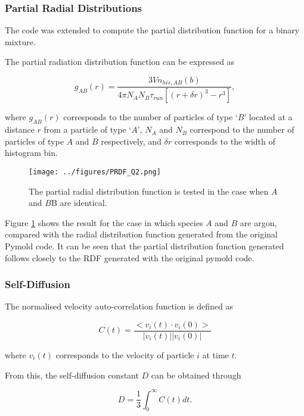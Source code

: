\documentclass{article}
\begin{document}
\subsubsection{Partial Radial Distributions}

The code was extended to compute the partial distribution function for a binary mixture.

The partial radiation distribution \cite{AllenTildesley} function can be expressed as 

\begin{equation}
g_{AB}(r) = \frac{3Vn_{his,AB}(b)}{4\pi N_A N_B \tau_{run}[(r+\delta r)^3 - r^3]},
\end{equation}

where $g_{AB}(r)$ corresponds to the number of particles of type `$B$' located at a distance $r$ from a particle of type `$A$', $N_A$ and $N_B$ correspond to the number of particles of type $A$ and $B$ respectively, and $\delta r$ corresponds to the width of histogram bin.

\begin{figure}[h]
    \centering
    \texttt{[image: ../figures/PRDF\_Q2.png]}
    \caption{The partial radial distribution function is tested in the case when $A$ and $B$B are identical. \label{fig:PRDFTest}}
\end{figure}

Figure \ref{fig:PRDFTest} shows the result for the case in which species $A$ and $B$ are argon, compared with the radial distribution function generated from the original Pymold code. It can be seen that the partial distribution function generated follows closely to the RDF generated with the original pymold code.

\subsubsection{Self-Diffusion}

The normalised  velocity auto-correlation function is defined as 

\begin{equation}
C(t) = \frac{<v_i(t) \cdot v_i (0)>}{|v_i(t)||v_i(0)|}
\end{equation}

where $v_i(t)$ corresponds to the velocity of particle $i$ at time $t$. 

From this, the self-diffusion constant $D$ can be obtained through

\begin{equation}
\label{eqn:D1}
D = \frac{1}{3} \int_{0}^{\infty}C(t)dt.
\end{equation}
\end{document}
